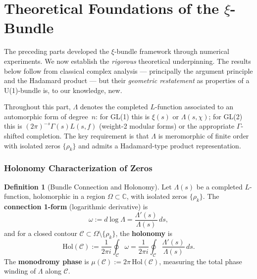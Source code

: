 \documentclass[11pt, a4paper]{article}
\theoremstyle{definition}
\newtheorem{definition}{Definition}[section]
\theoremstyle{plain}
\newcommand{\xif}{\xi}                      %
\begin{document}

\part{Theoretical Foundations of the $\xi$-Bundle}
\label{part:theory}

\noindent
The preceding parts developed the $\xi$-bundle framework through
numerical experiments. We now establish the \emph{rigorous} theoretical
underpinning. The results below follow from classical complex analysis
--- principally the argument principle and the Hadamard product --- but
their \emph{geometric restatement} as properties of a U(1)-bundle is,
to our knowledge, new.

Throughout this part, $\Lambda$ denotes the completed $L$-function
associated to an automorphic form of degree~$n$: for GL(1) this is
$\xif(s)$ or $\Lambda(s,\chi)$; for GL(2) this is
$(2\pi)^{-s}\Gamma(s)L(s,f)$ (weight-2 modular forms) or the
appropriate $\Gamma$-shifted completion. The key requirement is that
$\Lambda$ is meromorphic of finite order with isolated zeros $\{\rho_k\}$
and admits a Hadamard-type product representation.


\section{Holonomy Characterization of Zeros}
\label{sec:holonomy_thm}

\begin{definition}[Bundle Connection and Holonomy]
\label{def:connection_holonomy}
Let $\Lambda(s)$ be a completed $L$-function, holomorphic in a region
$\Omega \subset \mathbb{C}$, with isolated zeros $\{\rho_k\}$.
The \textbf{connection 1-form} (logarithmic derivative) is
\begin{equation}
  \omega := d\log\Lambda = \frac{\Lambda'(s)}{\Lambda(s)}\,ds,
  \label{eq:connection_form}
\end{equation}
and for a closed contour $\mathcal{C} \subset \Omega\setminus\{\rho_k\}$,
the \textbf{holonomy} is
\begin{equation}
  \mathrm{Hol}(\mathcal{C}) := \frac{1}{2\pi i}
  \oint_{\mathcal{C}} \omega
  = \frac{1}{2\pi i}\oint_{\mathcal{C}}
  \frac{\Lambda'(s)}{\Lambda(s)}\,ds.
  \label{eq:holonomy_def}
\end{equation}
The \textbf{monodromy phase} is
$\mu(\mathcal{C}) := 2\pi\,\mathrm{Hol}(\mathcal{C})$, measuring
the total phase winding of $\Lambda$ along $\mathcal{C}$.
\end{definition}
\end{document}
